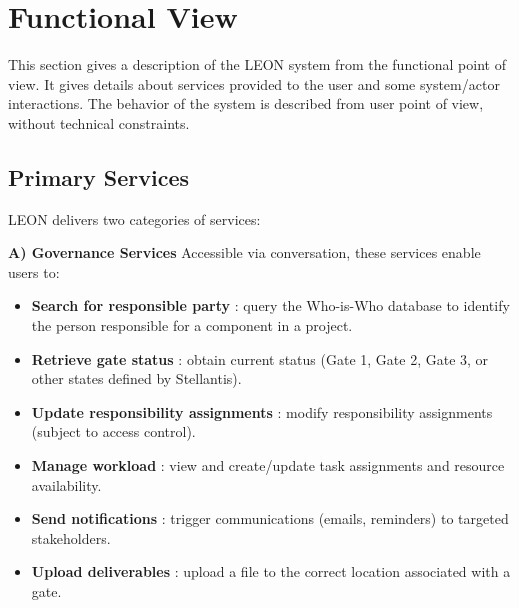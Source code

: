 \section{\textcolor[HTML]{0066CC}{Functional View}}
\label{sec:design-functional-view}
This section gives a description of the LEON system from the functional point of view. It gives details about services provided to the user and some system/actor interactions. The behavior of the system is described from user point of view, without technical constraints.
\subsection{Primary Services}

LEON delivers two categories of services:

\vspace{0.2cm}
\noindent\textcolor[HTML]{0066CC}{\textbf{A) Governance Services}}
Accessible via conversation, these services enable users to:
\begin{itemize}
    \item \textcolor[HTML]{003D99}{\textbf{Search for responsible party}} : query the Who-is-Who database to identify the person responsible for a component in a project.
    \item \textcolor[HTML]{003D99}{\textbf{Retrieve gate status}} : obtain current status (Gate 1, Gate 2, Gate 3, or other states defined by Stellantis).
    \item \textcolor[HTML]{003D99}{\textbf{Update responsibility assignments}} : modify responsibility assignments (subject to access control).
    \item \textcolor[HTML]{003D99}{\textbf{Manage workload}} : view and create/update task assignments and resource availability.
    \item \textcolor[HTML]{003D99}{\textbf{Send notifications}} : trigger communications (emails, reminders) to targeted stakeholders.
    \item \textcolor[HTML]{003D99}{\textbf{Upload deliverables}} : upload a file to the correct location associated with a gate.
\end{itemize}
\vspace{-4pt}

